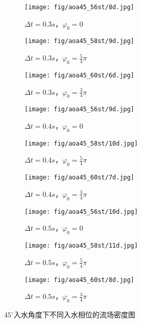 \begin{figure}[!htp]
  \quad 
  \begin{subfigure}{0.25\textwidth}
    \centering
    \texttt{[image: fig/aoa45\_56st/8d.jpg]}
    \caption{$\Delta t = 0.3s$，$\varphi_0 = 0$}
  \end{subfigure}
  \hspace{1cm}
  \begin{subfigure}{0.25\textwidth}
  \centering
  \texttt{[image: fig/aoa45\_58st/9d.jpg]}
  \caption{$\Delta t = 0.3s$，$\varphi_0 = \frac 5 4 \pi$}
  \end{subfigure}
  \hspace{1cm}
  \begin{subfigure}{0.25\textwidth}
  \centering
  \texttt{[image: fig/aoa45\_60st/6d.jpg]}
  \caption{$\Delta t = 0.3s$，$\varphi_0 = \frac 3 4 \pi$}
  \end{subfigure}

  \quad 
  \begin{subfigure}{0.25\textwidth}
    \centering
    \texttt{[image: fig/aoa45\_56st/9d.jpg]}
    \caption{$\Delta t = 0.4s$，$\varphi_0 = 0$}
  \end{subfigure}
  \hspace{1cm}
  \begin{subfigure}{0.25\textwidth}
  \centering
  \texttt{[image: fig/aoa45\_58st/10d.jpg]}
  \caption{$\Delta t = 0.4s$，$\varphi_0 = \frac 5 4 \pi$}
  \end{subfigure}
  \hspace{1cm}
  \begin{subfigure}{0.25\textwidth}
  \centering
  \texttt{[image: fig/aoa45\_60st/7d.jpg]}
  \caption{$\Delta t = 0.4s$，$\varphi_0 = \frac 3 4 \pi$}
  \end{subfigure}

  \quad 
  \begin{subfigure}{0.25\textwidth}
    \centering
    \texttt{[image: fig/aoa45\_56st/10d.jpg]}
    \caption{$\Delta t = 0.5s$，$\varphi_0 = 0$}
  \end{subfigure}
  \hspace{1cm}
  \begin{subfigure}{0.25\textwidth}
  \centering
  \texttt{[image: fig/aoa45\_58st/11d.jpg]}
  \caption{$\Delta t = 0.5s$，$\varphi_0 = \frac 5 4 \pi$}
  \end{subfigure}
  \hspace{1cm}
  \begin{subfigure}{0.25\textwidth}
  \centering
  \texttt{[image: fig/aoa45\_60st/8d.jpg]}
  \caption{$\Delta t = 0.5s$，$\varphi_0 = \frac 3 4 \pi$}
  \end{subfigure}


  \caption{$45^\circ$入水角度下不同入水相位的流场密度图}
  \label{fig:compare}
\end{figure}

